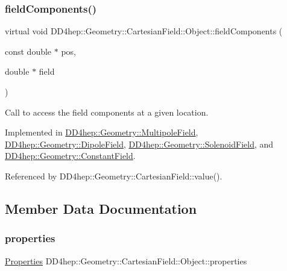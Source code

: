 \subsubsection{\texorpdfstring{field\+Components()}{fieldComponents()}}
{\footnotesize\ttfamily virtual void D\+D4hep\+::\+Geometry\+::\+Cartesian\+Field\+::\+Object\+::field\+Components (\begin{DoxyParamCaption}\item[{const double $\ast$}]{pos,  }\item[{double $\ast$}]{field }\end{DoxyParamCaption})\hspace{0.3cm}{\ttfamily [pure virtual]}}



Call to access the field components at a given location. 



Implemented in \hyperlink{class_d_d4hep_1_1_geometry_1_1_multipole_field_a06782e6f0fbdfcf53394ee5dda83b052}{D\+D4hep\+::\+Geometry\+::\+Multipole\+Field}, \hyperlink{class_d_d4hep_1_1_geometry_1_1_dipole_field_afee57d23345cdd6a457475d8fe6ac4a7}{D\+D4hep\+::\+Geometry\+::\+Dipole\+Field}, \hyperlink{class_d_d4hep_1_1_geometry_1_1_solenoid_field_aef35ec6873e2227025d3b770bdbdc1e1}{D\+D4hep\+::\+Geometry\+::\+Solenoid\+Field}, and \hyperlink{class_d_d4hep_1_1_geometry_1_1_constant_field_a512fc8911c0c3e710b363c455c2c9ea9}{D\+D4hep\+::\+Geometry\+::\+Constant\+Field}.



Referenced by D\+D4hep\+::\+Geometry\+::\+Cartesian\+Field\+::value().



\subsection{Member Data Documentation}
\hypertarget{class_d_d4hep_1_1_geometry_1_1_cartesian_field_1_1_object_a146cdd5fa292df237112a461ccaa0f6c}{}\label{class_d_d4hep_1_1_geometry_1_1_cartesian_field_1_1_object_a146cdd5fa292df237112a461ccaa0f6c} 
\subsubsection{\texorpdfstring{properties}{properties}}
{\footnotesize\ttfamily \hyperlink{class_d_d4hep_1_1_geometry_1_1_cartesian_field_a37a636b9f5ee9ead172cca958dacb920}{Properties} D\+D4hep\+::\+Geometry\+::\+Cartesian\+Field\+::\+Object\+::properties}



